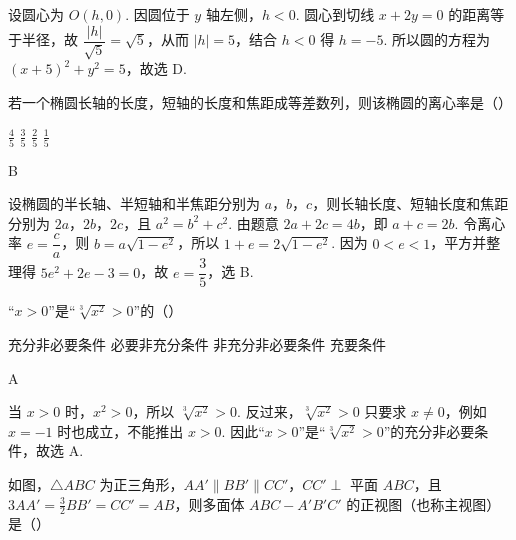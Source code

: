 \begin{solution}
设圆心为 \(O(h,0)\). 因圆位于 \(y\) 轴左侧，\(h<0\). 圆心到切线 \(x+2y=0\) 的距离等于半径，故
\(\dfrac{|h|}{\sqrt5}=\sqrt5\)，从而 \(|h|=5\)，结合 \(h<0\) 得 \(h=-5\). 所以圆的方程为
\((x+5)^2+y^2=5\)，故选 D.
\end{solution}

\begin{problem}
若一个椭圆长轴的长度，短轴的长度和焦距成等差数列，则该椭圆的离心率是（\quad）

\choices
    {\(\frac{4}{5}\)}
    {\(\frac{3}{5}\)}
    {\(\frac{2}{5}\)}
    {\(\frac{1}{5}\)}
\end{problem}

\begin{answer}
B
\end{answer}

\begin{solution}
设椭圆的半长轴、半短轴和半焦距分别为 \(a\)，\(b\)，\(c\)，则长轴长度、短轴长度和焦距分别为 \(2a\)，\(2b\)，\(2c\)，且 \(a^2=b^2+c^2\). 由题意
\(2a+2c=4b\)，即 \(a+c=2b\). 令离心率 \(e=\dfrac ca\)，则 \(b=a\sqrt{1-e^2}\)，所以
\(1+e=2\sqrt{1-e^2}\). 因为 \(0<e<1\)，平方并整理得 \(5e^2+2e-3=0\)，故 \(e=\dfrac35\)，选 B.
\end{solution}

\begin{problem}
“\(x > 0\)”是“\(\sqrt[3]{x^2} > 0\)”的（\quad）

\choices
    {充分非必要条件}
    {必要非充分条件}
    {非充分非必要条件}
    {充要条件}
\end{problem}

\begin{answer}
A
\end{answer}

\begin{solution}
当 \(x>0\) 时，\(x^2>0\)，所以 \(\sqrt[3]{x^2}>0\). 反过来，\(\sqrt[3]{x^2}>0\) 只要求 \(x\ne0\)，例如 \(x=-1\) 时也成立，不能推出 \(x>0\). 因此“\(x>0\)”是“\(\sqrt[3]{x^2}>0\)”的充分非必要条件，故选 A.
\end{solution}

\begin{problem}
如图，\(\triangle ABC\) 为正三角形，\(AA' \parallel BB' \parallel CC'\)，\(CC' \perp\) 平面 \(ABC\)，且 \(3AA' = \frac{3}{2} BB' = CC' = AB\)，则多面体 \(ABC - A'B'C'\) 的正视图（也称主视图）是（\quad）


    {}
    {}
    {}
\end{problem}

